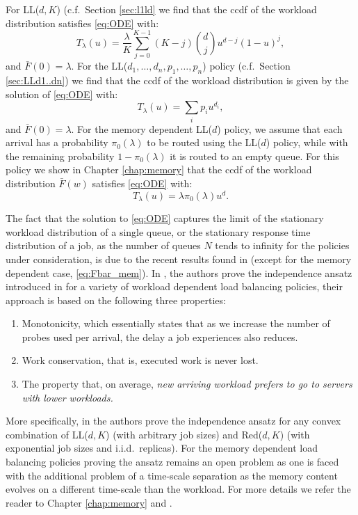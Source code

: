 \documentclass[12pt]{report}
\begin{document}
For LL($d, K$) (c.f.~Section \ref{sec:l1ld} we find that the ccdf of the workload distribution satisfies \eqref{eq:ODE} with: 
\begin{equation} \label{eq:LLdK_Tlam}
T_\lambda(u) = \frac{\lambda}{K} \sum_{j=0}^{K-1} (K-j) \binom{d}{j} u^{d-j} (1-u)^j,
\end{equation}
and $\bar F(0)=\lambda$.
For the LL($d_1,\dots,d_n, p_1, \dots, p_n$) policy (c.f.~Section \ref{sec:LLd1..dn}) we find that the ccdf of the workload distribution is given by the solution of \eqref{eq:ODE} with:
\begin{equation}\label{eq:Fbar_LLd1dn}
T_\lambda(u) = \sum_i p_i u^{d_i},
\end{equation}
and $\bar F(0)=\lambda$.
For the memory dependent LL($d$) policy, we assume that each arrival has a probability $\pi_0(\lambda)$ to be routed using the LL($d$) policy, while with the remaining probability $1-\pi_0(\lambda)$ it is routed to an empty queue. For this policy we show in Chapter \ref{chap:memory} that the ccdf of the workload distribution $\bar F(w)$ satisfies \eqref{eq:ODE} with:
\begin{equation}\label{eq:Fbar_mem}
T_\lambda(u) = \lambda \pi_0(\lambda) u^d.
\end{equation}

The fact that the solution to \eqref{eq:ODE} captures the limit of the stationary 
workload distribution of a single queue, or the stationary response time distribution
of a job, as the number of queues $N$ tends to
infinity for the policies under consideration, is due to the recent results found in \cite{shneer2020large} (except for the memory dependent case, \eqref{eq:Fbar_mem}). In \cite{shneer2020large}, the authors prove the independence ansatz introduced in \cite{bramsonAAP} for a variety of workload dependent load balancing policies, their approach is based on the following three properties:
\begin{enumerate}[label=(\alph*)]
\item Monotonicity, which essentially states that as we increase the number of probes used per arrival, the delay a job experiences also reduces. \label{item:monotonicity}
\item Work conservation, that is, executed work is never lost.
\item The property that, on average, \textit{new arriving workload prefers to go to servers with lower workloads.} \label{item:lower_loads}
\end{enumerate}
More specifically, in \cite{shneer2020large} the authors prove the 
independence ansatz for any convex combination of LL($d, K$) (with arbitrary job sizes) and Red($d, K$) (with exponential job sizes and i.i.d.~replicas). For the memory dependent load balancing policies proving the ansatz remains an open problem as one is faced with the additional problem of a time-scale separation as the memory content evolves on a different time-scale than the workload. For more details we refer the reader to Chapter \ref{chap:memory} and \cite{benaim2008class}.
\end{document}
